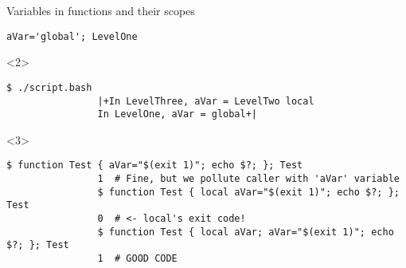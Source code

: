 \begin{frame}[fragile]{Variables in functions and their scopes}
\begin{overlayarea}{\textwidth}{0.7\textheight}
\begin{onlyenv}
\begin{lstlisting}[style=MyBash]
                aVar='global'; LevelOne
            \end{lstlisting}
        \end{onlyenv}
        \begin{onlyenv}<2>
            \begin{lstlisting}[style=MyBash, firstnumber=14]
                $ ./script.bash
                |+In LevelThree, aVar = LevelTwo local
                In LevelOne, aVar = global+|
            \end{lstlisting}
        \end{onlyenv}
        \begin{onlyenv}<3>
            \begin{lstlisting}[style=MyBash, style=oddnumbers, xleftmargin=1mm, xrightmargin=1mm, firstnumber=16]
                $ function Test { aVar="$(exit 1)"; echo $?; }; Test
                1  # Fine, but we pollute caller with 'aVar' variable
                $ function Test { local aVar="$(exit 1)"; echo $?; }; Test
                0  # <- local's exit code!
                $ function Test { local aVar; aVar="$(exit 1)"; echo $?; }; Test
                1  # GOOD CODE
            \end{lstlisting}
        \end{onlyenv}
    \end{overlayarea}
\end{frame}
